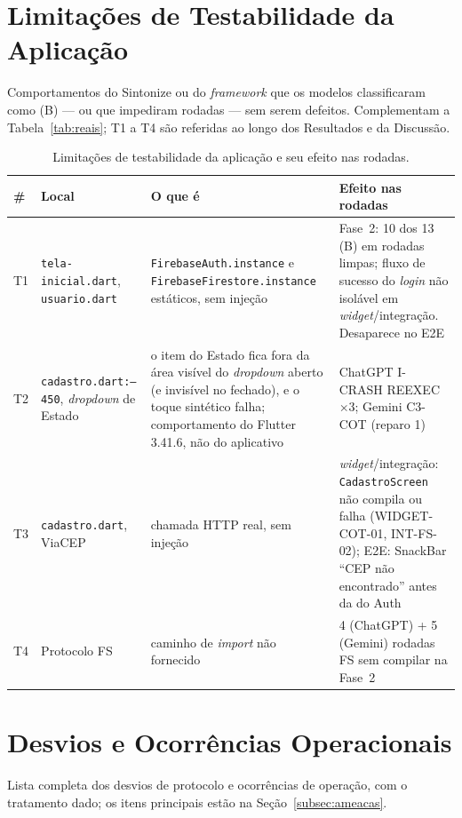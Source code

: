\documentclass[12pt]{article}
\begin{document}
\section{Limitações de Testabilidade da Aplicação}
\label{sec:apendice-testabilidade}

Comportamentos do Sintonize ou do \textit{framework} que os modelos
classificaram como (B) --- ou que impediram rodadas --- sem serem defeitos.
Complementam a Tabela~\ref{tab:reais}; T1 a T4 são referidas ao longo
dos Resultados e da Discussão.

\begin{table}[H]
\centering
\caption{Limitações de testabilidade da aplicação e seu efeito nas rodadas.}
\label{tab:testabilidade}
\footnotesize
\setlength{\tabcolsep}{3pt}
\begin{tabular}{lP{3.6cm}P{5cm}P{4.4cm}}
\toprule
\textbf{\#} & \textbf{Local} & \textbf{O que é} & \textbf{Efeito nas rodadas} \\
\midrule
T1 & \texttt{tela-inicial\allowbreak.dart}, \texttt{usuario.dart} & \texttt{FirebaseAuth\allowbreak.instance} e \texttt{FirebaseFirestore\allowbreak.instance} estáticos, sem injeção & Fase~2: 10 dos 13 (B) em rodadas limpas; fluxo de sucesso do \textit{login} não isolável em \textit{widget}/integração. Desaparece no E2E \\
T2 & \texttt{cadastro.dart:--450}, \textit{dropdown} de Estado & o item do Estado fica fora da área visível do \textit{dropdown} aberto (e invisível no fechado), e o toque sintético falha; comportamento do Flutter 3.41.6, não do aplicativo & ChatGPT I-CRASH REEXEC $\times$3; Gemini C3-COT (reparo 1) \\
T3 & \texttt{cadastro.dart}, ViaCEP & chamada HTTP real, sem injeção & \textit{widget}/integração: \texttt{CadastroScreen} não compila ou falha (WIDGET-COT-01, INT-FS-02); E2E: SnackBar ``CEP não encontrado'' antes da do Auth \\
T4 & Protocolo FS & caminho de \textit{import} não fornecido & 4 (ChatGPT) + 5 (Gemini) rodadas FS sem compilar na Fase~2 \\
\bottomrule
\end{tabular}
\end{table}


\section{Desvios e Ocorrências Operacionais}
\label{sec:apendice-desvios}

Lista completa dos desvios de protocolo e ocorrências de operação, com o
tratamento dado; os itens principais estão na Seção~\ref{subsec:ameacas}.
\end{document}
